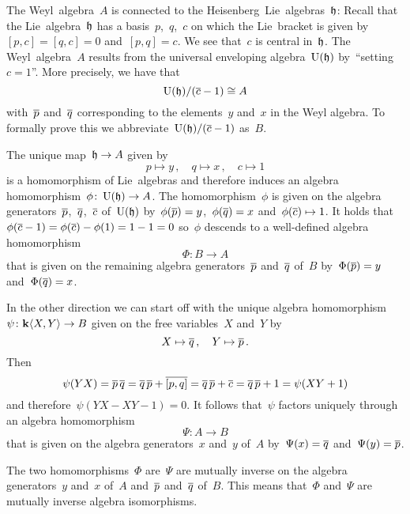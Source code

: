 \begin{remark}
  The Weyl~algebra~$A$ is connected to the {\threedimensional} Heisenberg~Lie~algebras~$\mathfrak{h}$:
  Recall that the Lie~algebra~$\mathfrak{h}$ has a basis~$p$,~$q$,~$c$ on which the Lie~bracket is given by~$[p,c] = [q,c] = 0$ and~$[p,q] = c$.
  We see that~$c$ is central in~$\mathfrak{h}$.
  The Weyl~algebra~$A$ results from the universal enveloping algebra~$\operatorname{U}(\mathfrak{h})$ by~\enquote{setting~$c = 1$}.
  More precisely, we have that
  \[
    \operatorname{U}(\mathfrak{h})/(\overline{c} - 1)
    \cong
    A
  \]
  with~$\overline{p}$ and~$\overline{q}$ corresponding to the elements~$y$ and~$x$ in the Weyl algebra.
  To formally prove this we abbreviate~$\operatorname{U}(\mathfrak{h})/(\overline{c} - 1)$ as~$B$.
  
  The unique {\linear{$\kf$}} map~$\mathfrak{h} \to A$ given by
  \[
    p \mapsto y \,,
    \quad
    q \mapsto x \,,
    \quad
    c \mapsto 1
  \]
  is a homomorphism of Lie~algebras and therefore induces an algebra homomorphism~$\phi \colon \operatorname{U}(\mathfrak{h}) \to A$.
  The homomorphism~$\phi$ is given on the algebra generators~$\overline{p}$,~$\overline{q}$,~$\overline{c}$ of~$\operatorname{U}(\mathfrak{h})$ by~$\phi(\overline{p}) = y$,~$\phi(\overline{q}) = x$ and~$\phi(\overline{c}) \mapsto 1$.
  It holds that~$\phi(\overline{c} - 1) = \phi(\overline{c}) - \phi(1) = 1 - 1 = 0$ so~$\phi$ descends to a well-defined algebra homomorphism
  \[
    \Phi
    \colon
    B
    \to
    A
  \]
  that is given on the remaining algebra generators~$\overline{p}$ and~$\overline{q}$ of~$B$ by~$\Phi(\overline{p}) = y$ and~$\Phi(\overline{q}) = x$.
  
  In the other direction we can start off with the unique algebra homomorphism~$\psi \colon \mathbf{k}\langle X,Y\rangle \to B$ given on the free variables~$X$ and~$Y$ by
  \[
    X \mapsto \overline{q} \,,
    \quad
    Y \mapsto \overline{p} \,.
  \]
  Then
  \[
    \psi(YX)
    =
    \overline{p} \, \overline{q}
    =
    \overline{q} \, \overline{p} + \overline{[p,q]}
    =
    \overline{q} \, \overline{p} + \overline{c}
    =
    \overline{q} \, \overline{p} + 1
    =
    \psi(XY + 1)
  \]
  and therefore~$\psi(YX - XY - 1) = 0$.
  It follows that~$\psi$ factors uniquely through an algebra homomorphism
  \[
    \Psi
    \colon
    A
    \to
    B
  \]
  that is given on the algebra generators~$x$ and~$y$ of~$A$ by~$\Psi(x) = \overline{q}$ and~$\Psi(y) = \overline{p}$.
  
  The two homomorphisms~$\Phi$ are~$\Psi$ are mutually inverse on the algebra generators~$y$ and~$x$ of~$A$ and~$\overline{p}$ and~$\overline{q}$ of~$B$.
  This means that~$\Phi$ and~$\Psi$ are mutually inverse algebra isomorphisms.
\end{remark}


